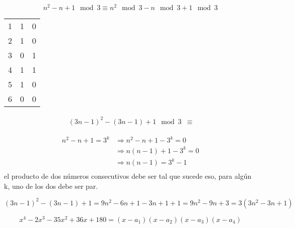 \documentclass[12pt]{report}
\newcounter{it}
\theoremstyle{largebreak}
\begin{document}
    \begin{sol}
        \begin{equation*}
            n^2-n+1 \mod 3 \equiv n^2\mod 3-n\mod 3+1\mod 3
        \end{equation*}

        \begin{tabular}{ccc}
            1 & 1 & 0 \\
            2 & 1 & 0 \\
            3 & 0 & 1 \\
            4 & 1 & 1 \\
            5 & 1 & 0 \\
            6 & 0 & 0 \\
        \end{tabular}

        \begin{equation*}
            \begin{split}
                (3n-1)^2-(3n-1)+1 \mod 3 &\equiv
            \end{split}
        \end{equation*}

        \begin{equation*}
            \begin{split}
                n^2-n+1=3^k&\Rightarrow n^2-n+1-3^k=0\\
                &\Rightarrow n(n-1)+1-3^k=0\\
                &\Rightarrow n(n-1)=3^k-1\\
            \end{split}
        \end{equation*}
        el producto de dos números consecutivos debe ser tal que sucede eso, para algún k, uno de los dos debe ser par.

        \begin{equation*}
            (3n-1)^2-(3n-1)+1=9n^2-6n+1-3n+1+1=9n^2-9n+3=3(3n^2-3n+1)
        \end{equation*}

    \end{sol}

    \begin{excer}
        \begin{equation*}
            x^4-2x^3-35x^2+36x+180=(x-a_1)(x-a_2)(x-a_3)(x-a_4)
        \end{equation*}
    \end{excer}
\end{document}
